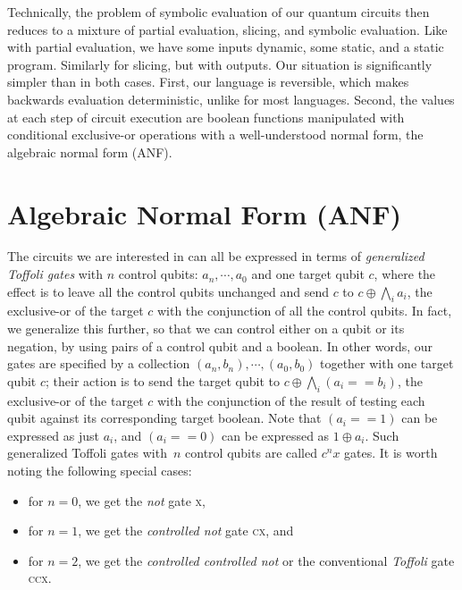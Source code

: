 \documentclass[sigplan,screen]{acmart}
\newcommand{\x}{\textsc{x}}
\newcommand{\cx}{\textsc{cx}}
\newcommand{\ccx}{\textsc{ccx}}
\theoremstyle{definition}
\begin{document}
Technically, the problem of symbolic evaluation of our quantum
circuits then reduces to a mixture of partial evaluation, slicing, and
symbolic evaluation. Like with partial evaluation, we have some inputs
dynamic, some static, and a static program. Similarly for slicing, but
with outputs. Our situation is significantly simpler than in both
cases. First, our language is reversible, which makes backwards
evaluation deterministic, unlike for most languages. Second, the
values at each step of circuit execution are boolean functions
manipulated with conditional exclusive-or operations with a
well-understood normal form, the algebraic normal form (ANF).

\section{Algebraic Normal Form (ANF)}
\label{anf}

The circuits we are interested in can all be expressed in terms of
\emph{generalized Toffoli gates} with $n$ control qubits:
$a_{n},\cdots,a_0$ and one target qubit $c$, where the effect is to
leave all the control qubits unchanged and send $c$ to
$c \oplus \bigwedge_i a_i$, the exclusive-or of the target $c$ with
the conjunction of all the control qubits. In fact, we generalize this
further, so that we can control either on a qubit or its negation, by
using pairs of a control qubit and a boolean. In other words, our
gates are specified by a collection $(a_{n}, b_{n}),\cdots,(a_0,b_0)$
together with one target qubit $c$; their action is to send the target
qubit to $c \oplus \bigwedge_i \left(a_i == b_i\right)$, the
exclusive-or of the target $c$ with the conjunction of the result of
testing each qubit against its corresponding target boolean. Note that
$\left(a_i == 1\right)$ can be expressed as just $a_i$, and
$\left(a_i == 0\right)$ can be expressed as $1 \oplus a_i$.  Such
generalized Toffoli gates with~$n$ control qubits are called $c^nx$
gates. It is worth noting the following special cases:
\begin{itemize}
  \item for $n=0$, we get the \emph{not} gate \x,
  \item for $n=1$, we get the \emph{controlled not} gate \cx, and
  \item for $n=2$, we get the \emph{controlled controlled not} or the
    conventional \emph{Toffoli} gate \ccx.
\end{itemize}
\end{document}
